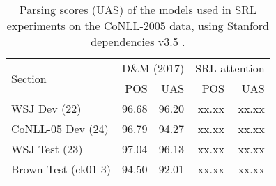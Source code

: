 \documentclass[11pt,a4paper]{article}
\begin{document}



\begin{table}
\begin{tabular}{lrrrr }
\multirow{2}{*}{Section} & \multicolumn{2}{c}{D\&M (2017)} & \multicolumn{2}{c}{SRL attention} \\
 & POS & UAS & POS & UAS\\ \hline \hline
WSJ Dev (22) & 96.68 & 96.20 & xx.xx & xx.xx \\
CoNLL-05 Dev (24) & 96.79 & 94.27 & xx.xx & xx.xx \\
WSJ Test (23) & 97.04 & 96.13 & xx.xx & xx.xx \\
Brown Test (ck01-3) & 94.50 & 92.01 & xx.xx & xx.xx \\
\end{tabular}
\caption{\label{conll05-parsing-numbers} Parsing scores (UAS) of the models used in SRL experiments on the CoNLL-2005 data, using Stanford dependencies v3.5 \citep{deMarneffe2008}.}
\end{table}
\end{document}
